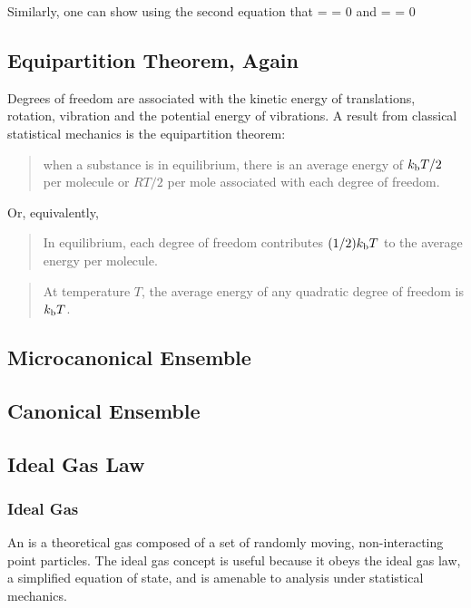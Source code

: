 Similarly, one can show using the second equation that
\beq
{} =  = 0\qquad{}
\eeq
and
\beq
{} =  = 0\qquad{}
\eeq


\subsection{Equipartition Theorem, Again}
Degrees of freedom are associated with the kinetic energy of translations, rotation, vibration and the potential energy of vibrations. A result from classical statistical mechanics is the equipartition theorem: 
\begin{quote}
when a substance is in equilibrium, there is an average energy of $k_\text{b} T/2$ per molecule or $RT/2$ per mole associated with each degree of freedom.
\end{quote}

Or, equivalently,
\begin{quote}
In equilibrium, each degree of freedom contributes $(1/2)k_\text{b} T$ to the average energy per molecule.
\end{quote}

\begin{quote}
At temperature $T$, the average energy of any quadratic degree of freedom is $k_\text{b} T$.
\end{quote}


\subsection{Microcanonical Ensemble}


\subsection{Canonical Ensemble}


\subsection{Ideal Gas Law}

\subsubsection{Ideal Gas}
An  is a theoretical gas composed of a set of randomly moving, non-interacting point particles. The ideal gas concept is useful because it obeys the ideal gas law, a simplified equation of state, and is amenable to analysis under statistical mechanics.

